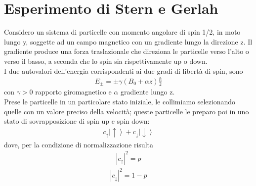 %
%
%
%

\section{Esperimento di Stern e Gerlah} %
Considero un sistema di particelle con momento angolare di spin 1/2, in moto lungo y, soggette ad un campo magnetico con un gradiente lungo la direzione z.
Il gradiente produce una forza traslazionale che direziona le particelle verso l'alto o verso il basso, a seconda che lo spin sia rispettivamente up o down. \\
I due autovalori dell'energia corrispondenti ai due gradi di libertà di spin, sono
\begin{equation}\begin{split}
E_{\pm}=\pm\gamma(B_{0}+\alpha z)\frac{\hbar}{2}
\end{split}\end{equation}
con $\gamma>0$ rapporto giromagnetico  e  $\alpha$ gradiente lungo z.\\
Prese le particelle in un particolare stato iniziale, le collimiamo selezionando quelle con un valore preciso della velocità; queste particelle le preparo poi in uno stato di sovrapposizione di spin up e spin down:
\begin{equation}\begin{split}
c_{\uparrow}\left|\uparrow\right\rangle+c_{\downarrow}\left|\downarrow\right\rangle
\end{split}\end{equation}
dove, per la condizione di normalizzazione risulta
\begin{equation}\begin{split}
\left|c_{\uparrow}\right|^2 = p
\end{split}\end{equation}
\begin{equation}\begin{split}
\left|c_{\downarrow}\right|^2 = 1-p
\end{split}\end{equation}
